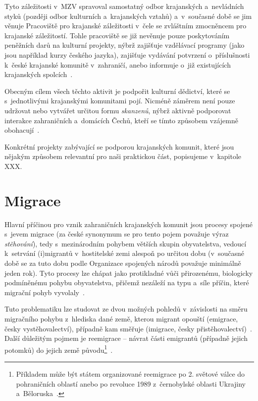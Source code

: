 Tyto záležitosti v~MZV spravoval samostatný odbor krajanských a~nevládních styků (později odbor kulturních a~krajanských vztahů) a~v~současné době se jim věnuje Pracoviště pro krajanské záležitosti v~čele se zvláštním zmocněncem pro krajanské záležitostí. Tohle pracoviště se již nevěnuje pouze poskytováním peněžních darů na kulturní projekty, nýbrž zajišťuje vzdělávací programy (jako jsou například kurzy českého jazyka), zajišťuje vydávání potvrzení o~příslušnosti k~české krajanské komunitě v~zahraničí, anebo informuje o~již existujících krajanských spolcích~\parencite{Krajane-mv3}.

Obecným cílem všech těchto aktivit je podpořit kulturní dědictví, které se s~jednotlivými krajanskými komunitami pojí. Nicméně záměrem není pouze udržovat nebo vytvářet určitou formu \emph{skanzenů}, nýbrž aktivně podporovat interakce zahraničních a~domácích Čechů, kteří se tímto způsobem vzájemně obohacují~\parencite{Broucek2009}.

Konkrétní projekty zabývající se podporou krajanských komunit, které jsou nějakým způsobem relevantní pro naši praktickou část, popisujeme v~kapitole XXX.

\hypertarget{migrace}{%
\section{Migrace}\label{migrace}}

Hlavní příčinou pro vznik zahraničních krajanských komunit jsou procesy spojené s~jevem migrace (za české synonymum se pro tento pojem považuje výraz \emph{stěhování}), tedy s~mezinárodním pohybem větších skupin obyvatelstva, vedoucí k~setrvání (i)migrantů v~hostitelské zemi alespoň po určitou dobu (v~současné době se za tuto dobu podle Organizace spojených národů považuje minimálně jeden rok). Tyto procesy lze chápat jako protikladné vůči přirozenému, biologicky podmíněnému pohybu obyvatelstva, přičemž nezáleží na typu a~síle příčin, které migrační pohyb vyvolaly~\parencite{Nespor2005}.

Tuto problematiku lze studovat ze dvou možných pohledů v~závislosti na směru migračního pohybu z~hlediska dané země, kterou migrant opouští (emigrace, česky vystěhovalectví), případně kam směřuje (imigrace, česky přistěhovalectví)~\parencite{Fialova2017b}. Další důležitým pojmem je reemigrace -- návrat části emigrantů (případně jejich potomků) do jejich země původu\footnote{Příkladem může být státem organizované reemigrace po 2. světové válce do pohraničních oblastí anebo po revoluce 1989 z~černobylské oblasti Ukrajiny a~Běloruska~\parencite{Vaculik2002}.}~\parencite{Nespor2005}.

